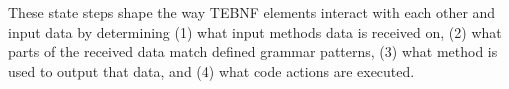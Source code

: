 \indent
These state steps shape the way TEBNF elements interact with each other and input data by determining (1) what input methods data is received on, (2) what parts of the received data match defined grammar patterns, (3) what method is used to output that data, and (4) what code actions are executed.














